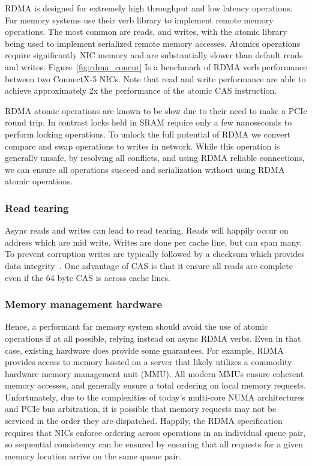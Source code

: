 RDMA is designed for extremely high throughput and low latency operations. Far
memory systems use their verb library to implement remote memory operations. The
most common are reads, and writes, with the atomic library being used to
implement serialized remote memory accesses. Atomics operations require
significantly NIC memory and are substantially slower than default reads and
writes. Figure~\ref{fig:rdma_concur} Is a benchmark of RDMA verb performance
between two ConnectX-5 NICs. Note that read and write performance are able to
achieve approximately 2x the performance of the atomic CAS instruction.

RDMA atomic operations are known to be slow due to their need to make a PCIe
round trip. In contrast locks held in SRAM require only a few nanoseconds to
perform locking operations. To unlock the full potential of RDMA we convert
compare and swap operations to writes in network. While this operation is
generally unsafe, by resolving all conflicts, and using RDMA reliable
connections, we can ensure all operations succeed and serialization without
using RDMA atomic operations.

\subsubsection{Read tearing}
Async reads and writes can lead to read tearing. Reads
will happily occur on address which are mid write. Writes are done per cache
line, but can span many. To prevent corruption writes are typically followed by
a checksum which provides data integrity~\cite{pilaf,clover}. One advantage of CAS is
that it ensure all reads are complete even if the 64 byte CAS is across cache
lines.

\subsubsection{Memory management hardware}

Hence, a performant far memory system should avoid the use of atomic operations
if at all possible, relying instead on async RDMA verbs.  Even in that case,
existing hardware does provide some guarantees.  For example, RDMA provides
access to memory hosted on a server that likely utilizes a commodity hardware
memory management unit (MMU).  All modern MMUs ensure coherent memory accesses,
and generally ensure a total ordering on local memory requests.  Unfortunately,
due to the complexities of today's multi-core NUMA architectures and PCIe bus
arbitration, it is possible that memory requests may not be serviced in the
order they are dispatched. Happily, the RDMA specification requires that NICs
enforce ordering across operations in an individual queue pair, so sequential
consistency can be ensured by ensuring that all requests for a given memory
location arrive on the same queue pair.



